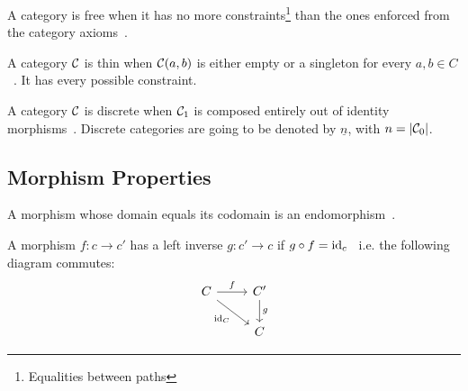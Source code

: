 \begin{definition}
  A category is free when it has no more constraints\footnote{Equalities
  between paths} than the ones enforced from the category axioms~\parencite{adamek_herrlich_strecker:joy_cats}.
\end{definition}

\begin{definition}
  A category $\mathcal{C}$ is thin when $\mathcal{C}(a, b)$ is either empty or a singleton for
  every $a,b\in C$~\parencite{adamek_herrlich_strecker:joy_cats}. It has every
  possible constraint.
\end{definition}

\begin{definition}
  A category $\mathcal{C}$ is discrete when $\mathcal{C}_1$ is composed entirely out of identity
  morphisms~\parencite{awodey:category_theory}. Discrete categories are going to
  be denoted by $\underline{n}$, with $n=|\mathcal{C}_0|$.
\end{definition}

\subsection{Morphism Properties}

\begin{definition}
  A morphism whose domain equals its codomain is an
  endomorphism~\parencite{riehl:category_theory_in_context}.
\end{definition}

\begin{definition}
  A morphism $f: c\to c'$ has a left inverse $g: c'\to c$ if $g\circ f =
  \mathrm{id}_c$~\parencite[p.~19]{lane:working_mathematician} i.e. the following
  diagram commutes:
  \[\begin{tikzcd}[ampersand replacement=\&]
    C \& {C'} \\
    \& C
    \arrow["f", from=1-1, to=1-2]
    \arrow["g", from=1-2, to=2-2]
    \arrow["{\id_C}"', from=1-1, to=2-2]
  \end{tikzcd}\]
\end{definition}

